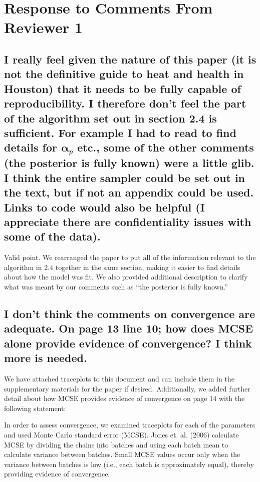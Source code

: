 \documentclass{article}
\begin{document}
\section{Response to Comments From Reviewer 1}
\subsection{I really feel given the nature of this paper (it is not the definitive guide to heat and health in Houston) that it needs to be fully capable of reproducibility.   I therefore don't feel the part of the algorithm set out in section 2.4 is sufficient.   For example I had to read to find details for $\boldsymbol{\alpha}_p$ etc., some of the other comments (the posterior is fully known) were a little glib.   I think the entire sampler could be set out in the text, but if not an appendix could be used.   Links to code would also be helpful (I appreciate there are confidentiality issues with some of the data).}

Valid point. We rearranged the paper to put all of the information relevant to the algorithm in 2.4 together in the same section, making it easier to find details about how the model was fit. We also provided additional description to clarify what was meant by our comments such as ``the posterior is fully known.''

\subsection{I don't think the comments on convergence are adequate.   On page 13 line 10; how does MCSE alone provide evidence of convergence?   I think more is needed.}
We have attached traceplots to this document and can include them in the supplementary materials for the paper if desired. Additionally, we added further detail about how MCSE provides evidence of convergence on page 14 with the following statement:

\begin{displayquote}
In order to assess convergence, we examined traceplots for each of the parameters and used Monte Carlo standard error (MCSE). Jones et. al. (2006) calculate MCSE by dividing the chains into batches and using each batch mean to calculate variance between batches. Small MCSE values occur only when the variance between batches is low (i.e., each batch is approximately equal), thereby providing evidence of convergence.
\end{displayquote}
\end{document}
